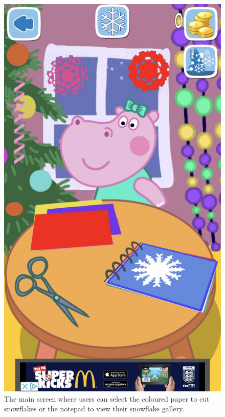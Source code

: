 \documentclass[11pt]{article}
\begin{document}
\begin{figure}[!ht]
\begin{minipage}{0.32\textwidth}
                            \includegraphics[width=0.8\linewidth]{Images/peppa/peppaMain}
                             \caption{The main screen where users can select the coloured paper to cut snowflakes or the notepad to view their snowflake gallery.\\}
                            \label{fig:peppaMain}
                        \end{minipage}
                        \begin{minipage}{0.32\textwidth}
                            \centering

\end{minipage}
\end{figure}
\end{document}
